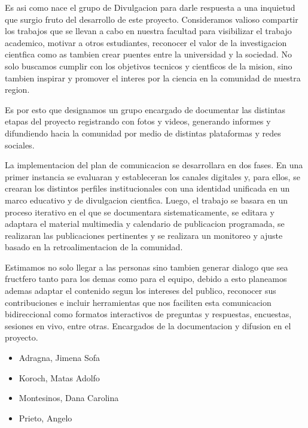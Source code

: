 \begin{itemize}
          Es asi como nace el grupo de Divulgacion para darle respuesta a una inquietud que
          surgio fruto del desarrollo de este proyecto. Consideramos valioso compartir los trabajos
          que se llevan a cabo en nuestra facultad para visibilizar el trabajo academico, motivar
          a otros estudiantes, reconocer el valor de la investigacion cientfica como as tambien
          crear puentes entre la universidad y la sociedad. No solo buscamos cumplir con los
          objetivos tecnicos y cientficos de la mision, sino tambien inspirar y promover el interes
          por la ciencia en la comunidad de nuestra region.

          Es por esto que designamos un grupo encargado de documentar las distintas etapas
          del proyecto registrando con fotos y videos, generando informes y difundiendo hacia la
          comunidad por medio de distintas plataformas y redes sociales.

          La implementacion del plan de comunicacion se desarrollara en dos fases. En una primer
          instancia se evaluaran y estableceran los canales digitales y, para ellos, se crearan los
          distintos perfiles institucionales con una identidad unificada en un marco educativo
          y de divulgacion cientfica. Luego, el trabajo se basara en un proceso iterativo en el
          que se documentara sistematicamente, se editara y adaptara el material multimedia y
          calendario de publicacion programada, se realizaran las publicaciones pertinentes y se
          realizara un monitoreo y ajuste basado en la retroalimentacion de la comunidad.

          Estimamos no solo llegar a las personas sino tambien generar dialogo que sea fructfero
          tanto para los demas como para el equipo, debido a esto planeamos ademas adaptar el
          contenido segun los intereses del publico, reconocer sus contribuciones e incluir
          herramientas que nos faciliten esta comunicacion bidireccional como formatos interactivos
          de preguntas y respuestas, encuestas, sesiones en vivo, entre otras.
          Encargados de la documentacion y difusion en el proyecto.
          \begin{itemize}
            \item Adragna, Jimena Sofa
            \item Koroch, Matas Adolfo
            \item Montesinos, Dana Carolina
            \item Prieto, Angelo
          \end{itemize}
      \end{itemize}


